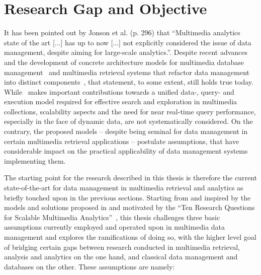 \section{Research Gap and Objective}
\label{section:research_gap}

It has been pointed out by Jonson et al. \cite{Jonson:2016} (p. 296) that ``Multimedia analytics state of the art [...] has up to now [...] not explicitly considered the issue of data management, despite aiming for large-scale analytics.''. Despite recent advances and the development of concrete architecture models for multimedia database management~\cite{Giangreco:2016adam,Giangreco:2018thesis} and multimedia retrieval systems that refactor data management into distinct components~\cite{Rossetto:2018thesis}, that statement, to some extent, still holds true today. While~\cite{Giangreco:2018thesis} makes important contributions towards a unified data-, query- and execution model required for effective search and exploration in multimedia collections, scalability aspects and the need for near real-time query performance, especially in the face of dynamic data, are not systematically considered. On the contrary, the proposed models -- despite being seminal for data management in certain multimedia retrieval applications -- postulate assumptions, that have considerable impact on the practical applicability of data management systems implementing them.

The starting point for the research described in this thesis is therefore the current state-of-the-art for data management in multimedia retrieval and analytics as briefly touched upon in the previous sections. Starting from and inspired by the models and solutions proposed in \cite{Giangreco:2016adam,Giangreco:2018thesis} and motivated by the ``Ten Research Questions for Scalable Multimedia Analytics''~\cite{Jonson:2016}, this thesis challenges three basic assumptions currently employed and operated upon in multimedia data management and explores the ramifications of doing so, with the higher level goal of bridging certain gaps between research conducted in multimedia retrieval, analysis and analytics on the one hand, and classical data management and databases on the other. These assumptions are namely:


